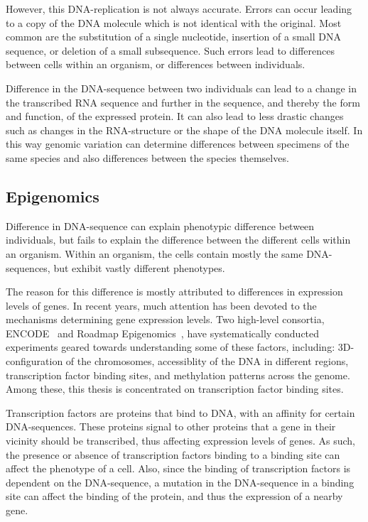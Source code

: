 However, this DNA-replication is not always accurate.
Errors can occur leading to a copy of the DNA molecule which is not identical with the original.
Most common are the substitution of a single nucleotide, insertion of a small DNA sequence, or deletion of a small subsequence.
Such errors lead to differences between cells within an organism, or differences between individuals.

Difference in the DNA-sequence between two individuals can lead to a change in the transcribed RNA sequence and further in the sequence, and thereby the form and function, of the expressed protein.
It can also lead to less drastic changes such as changes in the RNA-structure or the shape of the DNA molecule itself.
In this way genomic variation can determine differences between specimens of the same species and also differences between the species themselves.

\subsection{Epigenomics}
Difference in DNA-sequence can explain phenotypic
difference between individuals, but fails to explain the difference between the different cells within an organism.
Within an organism, the cells contain mostly the same DNA-sequences, but exhibit vastly different phenotypes.

The reason for this difference is mostly attributed to differences in expression levels of genes.
In recent years, much attention has been devoted to the mechanisms determining gene expression levels.
Two high-level consortia, ENCODE~\cite{encode} and Roadmap Epigenomics~\cite{roadmap}, have systematically conducted experiments geared towards understanding some of these factors, including: 3D-configuration of the chromosomes, accessiblity of the DNA in different regions, transcription factor binding sites, and methylation patterns across the genome.
Among these, this thesis is concentrated on transcription factor binding sites.

Transcription factors are proteins that bind to DNA, with an affinity for certain DNA-sequences.
These proteins signal to other proteins that a gene in their vicinity should be transcribed, thus affecting expression levels of genes.
As such, the presence or absence of transcription factors binding to a binding site can affect the phenotype of a cell.
Also, since the binding of transcription factors is dependent on the DNA-sequence, a mutation in the DNA-sequence in a binding site can affect the binding of the protein, and thus the expression of a nearby gene. 

